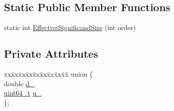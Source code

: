 \subsection*{Static Public Member Functions}
\begin{DoxyCompactItemize}
\item 
static int \hyperlink{classinternal_1_1Double_aa710fa4f5e06b0ff4348a13475688f13}{Effective\+Significand\+Size} (int order)
\end{DoxyCompactItemize}
\subsection*{Private Attributes}
\begin{DoxyCompactItemize}
\item 
\begin{tabbing}
xx\=xx\=xx\=xx\=xx\=xx\=xx\=xx\=xx\=\kill
union \{\\
\>double \hyperlink{classinternal_1_1Double_a9ed5b5245664da8abe6cdeefaed6452e}{d\_}\\
\>\hyperlink{stdint_8h_aec6fcb673ff035718c238c8c9d544c47}{uint64\_t} \hyperlink{classinternal_1_1Double_ad7523f7fe0c47d6aabe34f68b00a3250}{u\_}\\
\}; \\

\end{tabbing}\end{DoxyCompactItemize}
